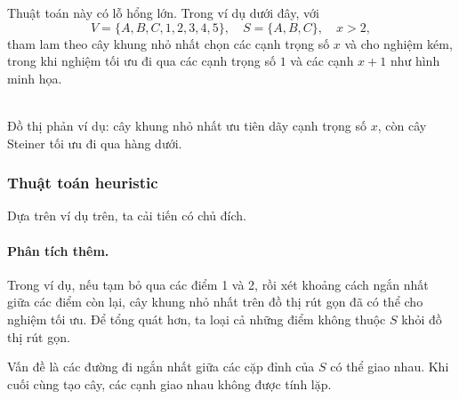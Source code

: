 \documentclass[11pt]{article}
\begin{document}
Thuật toán này có lỗ hổng lớn. Trong ví dụ dưới đây, với
\[
  V=\{A,B,C,1,2,3,4,5\},\quad S=\{A,B,C\},\quad x>2,
\]
tham lam theo cây khung nhỏ nhất chọn các cạnh trọng số \(x\) và cho nghiệm
kém, trong khi nghiệm tối ưu đi qua các cạnh trọng số \(1\) và các cạnh
\(x+1\) như hình minh họa.

\begin{center}
\\[-0.2em]
{\small Đồ thị phản ví dụ: cây khung nhỏ nhất ưu tiên dãy cạnh trọng số \(x\), còn cây Steiner tối ưu đi qua hàng dưới.}
\end{center}

\subsubsection{Thuật toán heuristic}

Dựa trên ví dụ trên, ta cải tiến có chủ đích.

\paragraph{Phân tích thêm.}
Trong ví dụ, nếu tạm bỏ qua các điểm 1 và 2, rồi xét khoảng cách ngắn nhất giữa
các điểm còn lại, cây khung nhỏ nhất trên đồ thị rút gọn đã có thể cho nghiệm
tối ưu. Để tổng quát hơn, ta loại cả những điểm không thuộc \(S\) khỏi đồ thị
rút gọn.

Vấn đề là các đường đi ngắn nhất giữa các cặp đỉnh của \(S\) có thể giao nhau.
Khi cuối cùng tạo cây, các cạnh giao nhau không được tính lặp.
\end{document}
